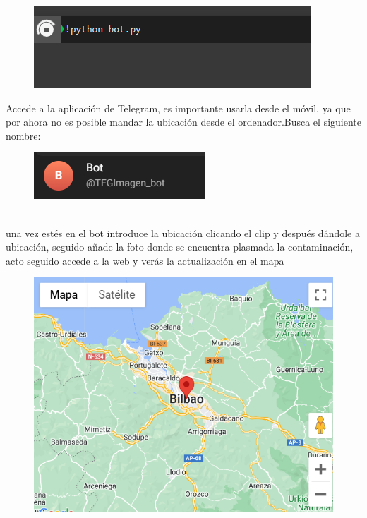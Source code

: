 \begin{figure}[H]
\centering
\includegraphics[scale=1]{imgs/lanzar.png}
\end{figure}

Accede a la aplicación de Telegram, es importante usarla desde el móvil, ya que por ahora no es posible mandar la ubicación desde el ordenador.Busca el siguiente nombre: 
\begin{figure}[h]
\centering
\includegraphics[scale=1]{imgs/bot.png}
\end{figure} \\
una vez estés en el bot introduce la ubicación clicando el clip y después dándole a ubicación, seguido añade la foto donde se encuentra plasmada la contaminación, acto seguido accede a la web y verás la actualización en el mapa
\begin{figure}[H]
\centering
\includegraphics[scale=1]{imgs/map.png}
\end{figure}









